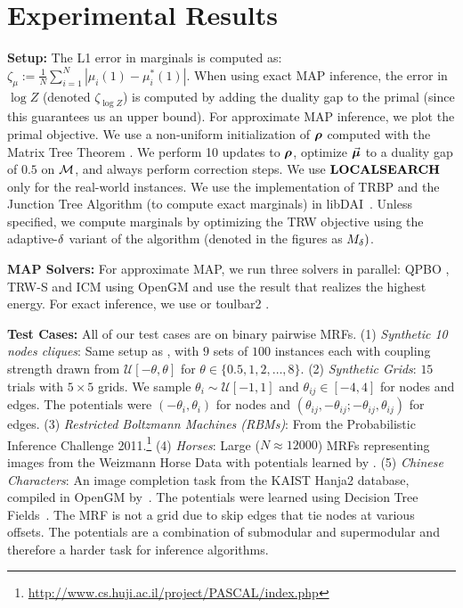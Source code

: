 \vspace{-2mm}
\section{Experimental Results\label{sec:expts}}
\vspace{-3mm}

\textbf{Setup: }
The L1 error in marginals is computed as:
$\zeta_{\mu} := \frac{1}{N} \sum_{i=1}^N |\mu_i(1)-\mu_i^*(1)|$. When using exact MAP inference, 
the error in $\log Z$ (denoted $\zeta_{\log Z}$) is computed
by adding the duality gap to the primal (since this guarantees us an upper bound). For approximate
MAP inference, we plot the primal objective. 
We use a non-uniform initialization of $\bm{\rho}$ computed with the Matrix Tree Theorem \citep{sontag2007new,koo2007structured}. 
We perform 10 updates to $\bm{\rho}$, optimize $\vec{\bm{\mu}}$ to a duality gap of $0.5$ on $\mathcal{M}$, and always
perform correction steps. We use $\textbf{\textrm{LOCALSEARCH}}$ only for the real-world instances.
%
%
%
We use the implementation of TRBP and the Junction Tree Algorithm (to compute exact marginals) in libDAI~\citep{Mooij_libDAI_10}.
%
Unless specified, we compute 
marginals by optimizing the TRW objective using the adaptive-$\delta$ variant of the
algorithm (denoted in the figures as $M_{\delta})$.
%
%
%

\textbf{MAP Solvers:} 
For approximate MAP, we run three solvers in parallel:
QPBO \citep{kolmogorov2007minimizing,boykov2004experimental},
TRW-S \citep{kolmogorov2006convergent} and ICM \citep{besag1986statistical} using
OpenGM \citep{andres2012opengm} and use the result that realizes the highest energy. 
For exact inference, we use \citet{gurobi} or toulbar2 \citep{allouche2010toulbar2}.

\textbf{Test Cases:} All of our test cases are on binary pairwise MRFs.
	(1) \textit{Synthetic 10 nodes cliques}: Same setup as
        \citet[Fig.~2]{sontag2007new}, with $9$ sets of $100$ instances each with coupling strength drawn from $\mathcal{U}[-\theta,\theta]$ for $\theta\in \{0.5,1,2,\ldots,8\}$.  
	(2) \textit{Synthetic Grids}: $15$ trials with $5\times5$ grids.
		We sample $\theta_i \sim\mathcal{U}[-1,1]$
          and $\theta_{ij}\in[-4,4]$ for nodes and edges. The
          potentials were $(-\theta_i,\theta_i)$ for nodes and
          $(\theta_{ij},-\theta_{ij}; -\theta_{ij},\theta_{ij})$ for edges.
	(3) \textit{Restricted Boltzmann Machines (RBMs)}: From the Probabilistic Inference Challenge 2011.\footnote{\url{http://www.cs.huji.ac.il/project/PASCAL/index.php}}
	(4) \textit{Horses}: Large ($N\approx 12000$) MRFs representing images from the Weizmann Horse Data \citep{classSpec} with potentials learned by
	\cite{domke2013learning}. 
	(5) \textit{Chinese Characters}: An image completion task from
        the KAIST Hanja2 database, compiled in OpenGM
        by~\citet{andres2012opengm}. The potentials were learned using Decision Tree Fields~\citep{nowozin2011decision}.
		The MRF is not a grid due to skip edges that tie nodes at various offsets. The potentials are a combination of submodular and 
		supermodular and therefore a harder task for inference algorithms. 


